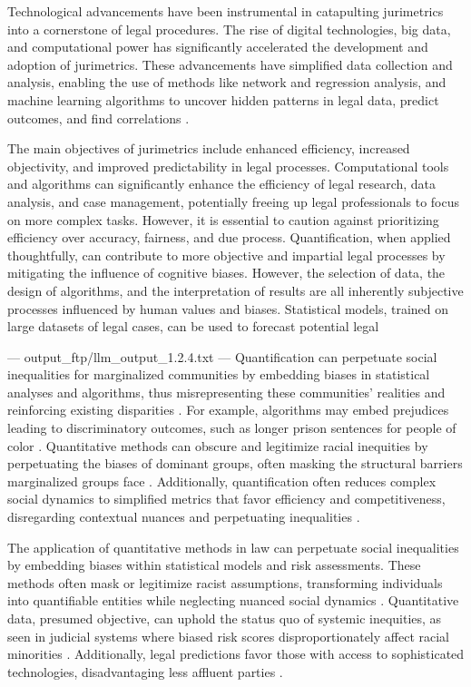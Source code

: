 Technological advancements have been instrumental in catapulting jurimetrics into a cornerstone of legal procedures. The rise of digital technologies, big data, and computational power has significantly accelerated the development and adoption of jurimetrics. These advancements have simplified data collection and analysis, enabling the use of methods like network and regression analysis, and machine learning algorithms to uncover hidden patterns in legal data, predict outcomes, and find correlations \cite{10.1007/s11186-021-09453-1,unger2021process}.

The main objectives of jurimetrics include enhanced efficiency, increased objectivity, and improved predictability in legal processes. Computational tools and algorithms can significantly enhance the efficiency of legal research, data analysis, and case management, potentially freeing up legal professionals to focus on more complex tasks. However, it is essential to caution against prioritizing efficiency over accuracy, fairness, and due process. Quantification, when applied thoughtfully, can contribute to more objective and impartial legal processes by mitigating the influence of cognitive biases. However, the selection of data, the design of algorithms, and the interpretation of results are all inherently subjective processes influenced by human values and biases. Statistical models, trained on large datasets of legal cases, can be used to forecast potential legal


---
output_ftp/llm_output_1.2.4.txt
---
Quantification can perpetuate social inequalities for marginalized communities by embedding biases in statistical analyses and algorithms, thus misrepresenting these communities' realities and reinforcing existing disparities \cite{saltelli2020}. For example, algorithms may embed prejudices leading to discriminatory outcomes, such as longer prison sentences for people of color \cite{saltelli2020}. Quantitative methods can obscure and legitimize racial inequities by perpetuating the biases of dominant groups, often masking the structural barriers marginalized groups face \cite{gillborn2017, gillborn2017}. Additionally, quantification often reduces complex social dynamics to simplified metrics that favor efficiency and competitiveness, disregarding contextual nuances and perpetuating inequalities \cite{camargo2022, di2023}.

The application of quantitative methods in law can perpetuate social inequalities by embedding biases within statistical models and risk assessments. These methods often mask or legitimize racist assumptions, transforming individuals into quantifiable entities while neglecting nuanced social dynamics \cite{gillborn2017, gillborn2017, gillborn2017}. Quantitative data, presumed objective, can uphold the status quo of systemic inequities, as seen in judicial systems where biased risk scores disproportionately affect racial minorities \cite{saltelli2020, lynch2019}. Additionally, legal predictions favor those with access to sophisticated technologies, disadvantaging less affluent parties \cite{ribeiro2021, ribeiro2021}.

